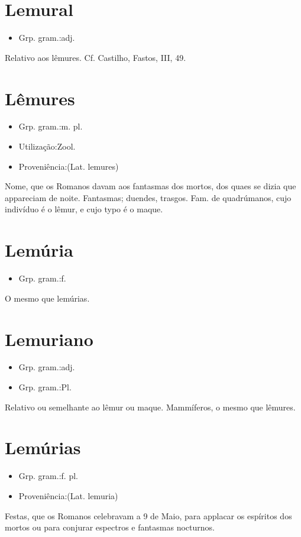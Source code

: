 \section{Lemural}
\begin{itemize}
\item {Grp. gram.:adj.}
\end{itemize}
Relativo aos lêmures. Cf. Castilho, \textunderscore Fastos\textunderscore , III, 49.
\section{Lêmures}
\begin{itemize}
\item {Grp. gram.:m. pl.}
\end{itemize}
\begin{itemize}
\item {Utilização:Zool.}
\end{itemize}
\begin{itemize}
\item {Proveniência:(Lat. \textunderscore lemures\textunderscore )}
\end{itemize}
Nome, que os Romanos davam aos fantasmas dos mortos, dos quaes se dizia que appareciam de noite.
Fantasmas; duendes, trasgos.
Fam. de quadrúmanos, cujo indivíduo é o lêmur, e cujo typo é o maque.
\section{Lemúria}
\begin{itemize}
\item {Grp. gram.:f.}
\end{itemize}
O mesmo que \textunderscore lemúrias\textunderscore .
\section{Lemuriano}
\begin{itemize}
\item {Grp. gram.:adj.}
\end{itemize}
\begin{itemize}
\item {Grp. gram.:Pl.}
\end{itemize}
Relativo ou semelhante ao lêmur ou maque.
Mammíferos, o mesmo que \textunderscore lêmures\textunderscore .
\section{Lemúrias}
\begin{itemize}
\item {Grp. gram.:f. pl.}
\end{itemize}
\begin{itemize}
\item {Proveniência:(Lat. \textunderscore lemuria\textunderscore )}
\end{itemize}
Festas, que os Romanos celebravam a 9 de Maio, para applacar os espíritos dos mortos ou para conjurar espectros e fantasmas nocturnos.
